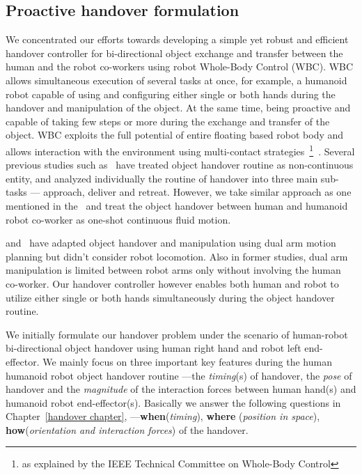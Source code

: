 \subsection{Proactive handover formulation}

We concentrated our efforts towards developing a simple yet robust and efficient handover controller for bi-directional object exchange and transfer between the human and the robot co-workers using robot Whole-Body Control (WBC). WBC allows simultaneous execution of several tasks at once, for example, a humanoid robot capable of using and configuring either single or both hands during the handover and manipulation of the object. At the same time, being proactive and capable of taking few steps or more during the exchange and transfer of the object. WBC exploits the full potential of entire floating based robot body and allows interaction with the environment using multi-contact strategies~\footnote{as explained by the IEEE Technical Committee on Whole-Body Control}~\cite{ladder-HRP-2Kai}. Several previous studies such as~\cite{strabala2013toward, huber2008human} have treated object handover routine as non-continuous entity, and analyzed individually the routine of handover into three main sub-tasks — approach, deliver and retreat. However, we take similar approach as one mentioned in the~\cite{medina2016human, nemlekarprompt} and treat the object handover between human and humanoid robot co-worker as one-shot continuous fluid motion.

\cite{vahrenkamp2009humanoid, vezzani2017novel} and~\cite{kim2004advanced} have adapted object handover and manipulation using dual arm motion planning but didn't consider robot locomotion. Also in former studies, dual arm manipulation is limited between robot arms only without involving the human co-worker. Our handover controller however enables both human and robot to utilize either single or both hands simultaneously during the object handover routine.

We initially formulate our handover problem under the scenario of human-robot bi-directional object handover using human right hand and robot left end-effector. We mainly focus on three important key features during the human humanoid robot object handover routine ---the \textit{timing}(s) of handover, the \textit{pose} of handover and the \textit{magnitude} of the interaction forces between human hand(s) and humanoid robot end-effector(s). Basically we answer the following questions in Chapter~\ref{handover chapter}, ---\textbf{when}(\textit{timing}), \textbf{where} (\textit{position in space}), \textbf{how}(\textit{orientation and interaction forces}) of the handover.

